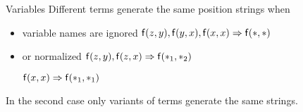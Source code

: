 

	
	\begin{block}{Variables}
		Different terms generate the same position strings
		\pause
		when
		\begin{itemize}
			\item variable names are ignored 
			\hfill${\mathsf f}(z,y), {\mathsf f}(y,x), {\mathsf f}(x,x) \Rightarrow {\mathsf f}(*,*)$
			\pause
			\item or normalized 
			\hfill${\mathsf f}(z,y), {\mathsf f}(z,x) \Rightarrow {\mathsf f}(*_1,*_2)$
			
			\hfill${\mathsf f}(x,x)\Rightarrow{\mathsf f}(*_1,*_1)$
		\end{itemize}
		\pause
		In the second case only variants of terms generate the same strings.
\end{block}